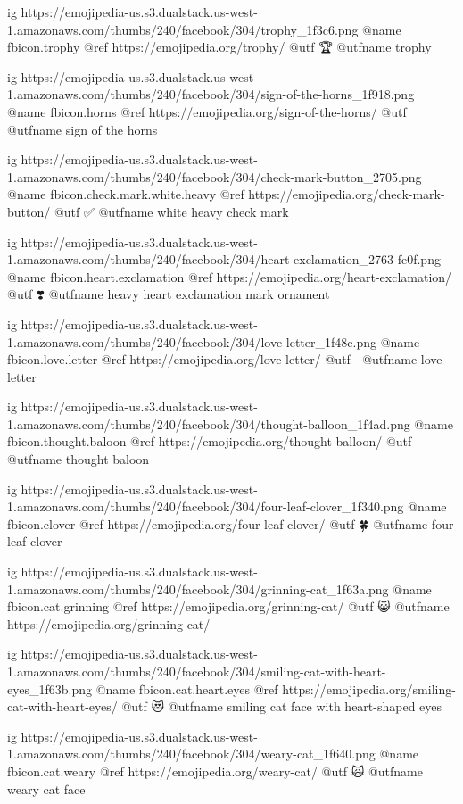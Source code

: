 	ig https://emojipedia-us.s3.dualstack.us-west-1.amazonaws.com/thumbs/240/facebook/304/trophy_1f3c6.png
	@name fbicon.trophy
	@ref https://emojipedia.org/trophy/
	@utf 🏆
	@utfname trophy

	ig https://emojipedia-us.s3.dualstack.us-west-1.amazonaws.com/thumbs/240/facebook/304/sign-of-the-horns_1f918.png
	@name fbicon.horns
	@ref https://emojipedia.org/sign-of-the-horns/
	@utf 🤘
	@utfname sign of the horns

	ig https://emojipedia-us.s3.dualstack.us-west-1.amazonaws.com/thumbs/240/facebook/304/check-mark-button_2705.png
	@name fbicon.check.mark.white.heavy
	@ref https://emojipedia.org/check-mark-button/
	@utf ✅
	@utfname white heavy check mark

	ig https://emojipedia-us.s3.dualstack.us-west-1.amazonaws.com/thumbs/240/facebook/304/heart-exclamation_2763-fe0f.png
	@name fbicon.heart.exclamation
	@ref https://emojipedia.org/heart-exclamation/
	@utf ❣️
	@utfname heavy heart exclamation mark ornament

	ig https://emojipedia-us.s3.dualstack.us-west-1.amazonaws.com/thumbs/240/facebook/304/love-letter_1f48c.png
	@name fbicon.love.letter
	@ref https://emojipedia.org/love-letter/
	@utf 💌
	@utfname love letter

	ig https://emojipedia-us.s3.dualstack.us-west-1.amazonaws.com/thumbs/240/facebook/304/thought-balloon_1f4ad.png
	@name fbicon.thought.baloon
	@ref https://emojipedia.org/thought-balloon/
	@utf 💭
	@utfname thought baloon

	ig https://emojipedia-us.s3.dualstack.us-west-1.amazonaws.com/thumbs/240/facebook/304/four-leaf-clover_1f340.png
	@name fbicon.clover
	@ref https://emojipedia.org/four-leaf-clover/
	@utf 🍀
	@utfname four leaf clover

	ig https://emojipedia-us.s3.dualstack.us-west-1.amazonaws.com/thumbs/240/facebook/304/grinning-cat_1f63a.png
	@name fbicon.cat.grinning
	@ref https://emojipedia.org/grinning-cat/
	@utf 😺
	@utfname https://emojipedia.org/grinning-cat/

	ig https://emojipedia-us.s3.dualstack.us-west-1.amazonaws.com/thumbs/240/facebook/304/smiling-cat-with-heart-eyes_1f63b.png
	@name fbicon.cat.heart.eyes
	@ref https://emojipedia.org/smiling-cat-with-heart-eyes/
	@utf 😻
	@utfname smiling cat face with heart-shaped eyes

	ig https://emojipedia-us.s3.dualstack.us-west-1.amazonaws.com/thumbs/240/facebook/304/weary-cat_1f640.png
	@name fbicon.cat.weary
	@ref https://emojipedia.org/weary-cat/
	@utf 🙀
	@utfname weary cat face

